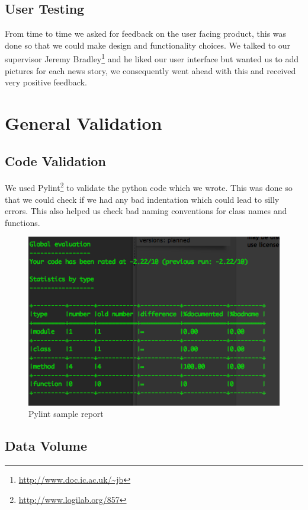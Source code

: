 \documentclass[a4paper,12pt]{article}
\begin{document}
  	\subsection{User Testing}
  	  From time to time we asked for feedback on the user facing product, this was done so that we could make design and functionality choices. We talked to our supervisor Jeremy Bradley\footnote{\url{http://www.doc.ic.ac.uk/~jb}} and he liked our user interface but wanted us to add pictures for each news story, we consequently went ahead with this and received very positive feedback.
	
	\section{General Validation}
	
	\subsection{Code Validation}
	We used Pylint\footnote{\url{http://www.logilab.org/857}} to validate the python code which we wrote. This was done so that we could check if we had any bad indentation which could lead to silly errors. This also helped us check bad naming conventions for class names and functions.
	
	\begin{figure}[ht!]
				\centering
					\includegraphics[scale=0.4]{pylint.png}
				\caption{Pylint sample report}
	\end{figure}
	
		\subsection{Data Volume}
\end{document}
